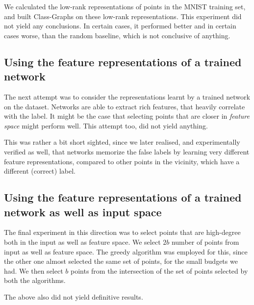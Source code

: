 \documentclass[12pt, oneside]{book}
\begin{document}
We calculated the low-rank representations of points in the MNIST training set,
and built Class-Graphs on these low-rank representations. This experiment did
not yield any conclusions. In certain cases, it performed better and in certain
cases worse, than the random baseline, which is not conclusive of anything.

\subsection{Using the feature representations of a trained network}
The next attempt was to consider the representations learnt by a trained network
on the dataset. Networks are able to extract rich features, that heavily
correlate with the label. It might be the case that selecting points that are
closer in \emph{feature space} might perform well. This attempt too, did not
yield anything.

This was rather a bit short sighted, since we later realised, and experimentally
verified as well, that networks memorize the false labels by learning very
different feature representations, compared to other points in the vicinity,
which have a different (correct) label.


\subsection{Using the feature representations of a trained network as well as input space}

The final experiment in this direction was to select points that are high-degree
both in the input as well as feature space. We select $2b$ number of points from
input as well as feature space. The greedy algorithm was employed for this,
since the other one almost selected the same set of points, for the small
budgets we had. We then select $b$ points from the intersection of the set of
points selected by both the algorithms.

The above also did not yield definitive results.
\end{document}
